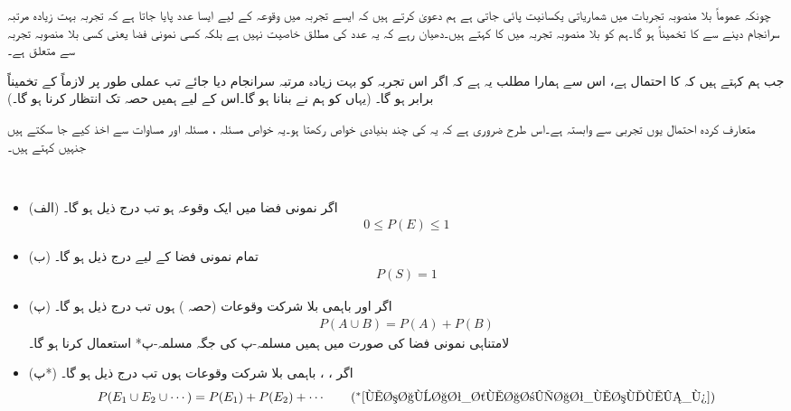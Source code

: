 چونکہ عموماً بلا منصوبہ تجربات میں شماریاتی یکسانیت پائی جاتی ہے ہم  دعویٰ کرتے ہیں کہ ایسے تجربہ میں وقوعہ  کے لیے ایسا عدد  پایا جاتا ہے کہ تجربہ بہت زیادہ مرتبہ سرانجام دینے سے   کا  تخمیناً  ہو گا۔ہم  کو  بلا منصوبہ تجربہ میں  کا  کہتے ہیں۔دھیان رہے کہ یہ عدد  کی مطلق خاصیت نہیں ہے بلکہ کسی نمونی فضا  یعنی کسی بلا منصوبہ تجربہ سے متعلق ہے۔

جب ہم کہتے ہیں کہ  کا احتمال  ہے، اس سے ہمارا مطلب یہ ہے کہ اگر اس تجربہ کو بہت زیادہ مرتبہ سرانجام دیا جائے تب    عملی طور پر لازماً  کے تخمیناً برابر ہو گا۔ (یہاں   کو ہم نے  بنانا ہو گا۔اس کے لیے ہمیں حصہ  تک  انتظار کرنا ہو گا۔)

متعارف کردہ احتمال یوں تجربی   سے وابستہ ہے۔اس طرح ضروری ہے کہ یہ  کی چند بنیادی خواص رکھتا ہو۔یہ خواص مسئلہ ، مسئلہ  اور مساوات   سے اخذ کیے جا سکتے ہیں جنہیں  کہتے ہیں۔

\\
\begin{itemize}
\item{(الف)}
اگر نمونی فضا  میں  ایک وقوعہ ہو تب درج ذیل ہو گا۔
\begin{align}\label{مساوات_شماریات_مسلمہ_الف}
0\le P(E)\le 1
\end{align}
%
\item{(ب)}
تمام نمونی فضا کے لیے درج ذیل ہو گا۔
\begin{align}\label{مساوات_شماریات_مسلمہ_ب}
P(S)=1
\end{align}
%
\item{(پ)}
اگر   اور  باہمی بلا شرکت وقوعات (حصہ ) ہوں تب درج ذیل ہو گا۔
\begin{align}\label{مساوات_شماریات_مسلمہ_پ}
P(A\cup B)=P(A)+P(B)
\end{align}
%
لامتناہی نمونی فضا کی صورت میں ہمیں مسلمہ-پ کی جگہ مسلمہ-پ*  استعمال کرنا ہو گا۔
\item{(پ*)}
اگر ، ،  باہمی بلا شرکت وقوعات ہوں تب درج ذیل ہو گا۔
\begin{align*}
P(E_1\cup E_2 \cup\cdots)=P(E_1)+P(E_2)+\cdots  \tag{$^*$\ref{مساوات_شماریات_مسلمہ_پ}}
\end{align*}
\end{itemize}

